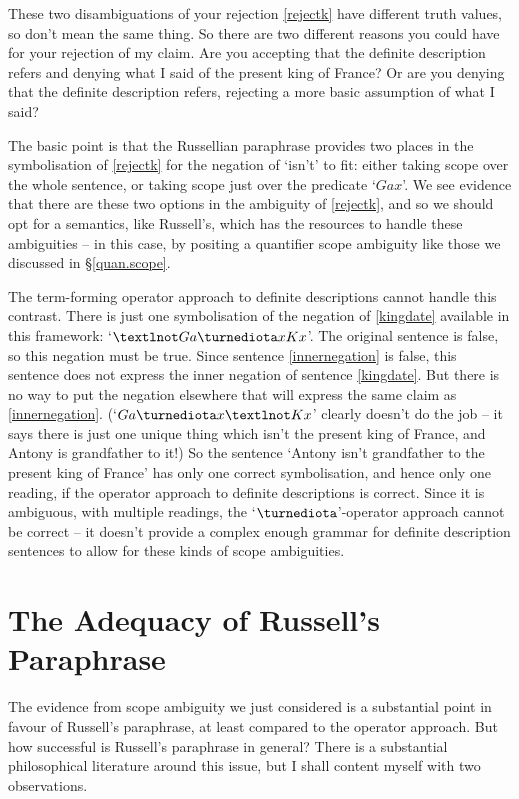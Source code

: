 These two disambiguations of your rejection \ref{rejectk} have different truth values, so don't mean the same thing. So there are two different reasons you could have for your rejection of my claim. Are you accepting that the definite description refers and denying what I said of the present king of France? Or are you denying that the definite description refers, rejecting a more basic assumption of what I said? 

The basic point is that the Russellian paraphrase provides two places in the symbolisation of \ref{rejectk} for the negation of `isn't' to fit: either taking scope over the whole sentence, or taking scope just over the predicate `$Gax$'. We see evidence that there are these two options in the ambiguity of \ref{rejectk}, and so we should opt for a semantics, like Russell's, which has the resources to handle these ambiguities – in this case, by positing a quantifier scope ambiguity like those we discussed in §\ref{quan.scope}.

The term-forming operator approach to definite descriptions cannot handle this contrast. There is just one symbolisation of the negation of \ref{kingdate} available in this framework: `$¬Ga\maththe x Kx$'. The original sentence is false, so this negation must be true. Since sentence \ref{innernegation} is false, this sentence does not express the inner negation of sentence \ref{kingdate}. But there is no way to put the negation elsewhere that will express the same claim as \ref{innernegation}. (`$Ga\maththe x ¬Kx$' clearly doesn't do the job – it says there is just one unique thing which isn't the present king of France, and Antony is grandfather to it!) So the sentence `Antony isn't grandfather to the present king of France' has only one correct symbolisation, and hence only one reading, if the operator approach to definite descriptions is correct. Since it is ambiguous, with multiple readings, the `$\maththe$'-operator approach cannot be correct – it doesn't provide a complex enough grammar for definite description sentences to allow for these kinds of scope ambiguities.


\section{The Adequacy of Russell's Paraphrase} \label{strawson}
The evidence from scope ambiguity we just considered is a substantial point in favour of Russell's paraphrase, at least compared to the operator approach. But how successful is Russell's paraphrase in general?  There is a substantial philosophical literature around this issue, but I shall content myself with two observations.

